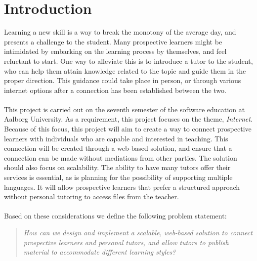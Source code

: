 \chapter{Introduction}
Learning a new skill is a way to break the monotony of the average day, and presents a challenge to the student.
Many prospective learners might be intimidated by embarking on the learning process by themselves, and feel reluctant to start.
One way to alleviate this is to introduce a tutor to the student, who can help them attain knowledge related to the topic and guide them in the proper direction.
This guidance could take place in person, or through various internet options after a connection has been established between the two.
\\\\
This project is carried out on the seventh semester of the software education at Aalborg University. 
As a requirement, this project focuses on the theme, \textit{Internet}.
Because of this focus, this project will aim to create a way to connect prospective learners with individuals who are capable and interested in teaching.
This connection will be created through a web-based solution, and ensure that a connection can be made without mediations from other parties.
The solution should also focus on scalability. 
The ability to have many tutors offer their services is essential, as is planning for the possibility of supporting multiple languages. 
It will allow prospective learners that prefer a structured approach without personal tutoring to access files from the teacher.
\\\\
Based on these considerations we define the following problem statement:
\begin{quote}
    \textit{How can we design and implement a scalable, web-based solution to connect prospective learners and personal tutors, and allow tutors to publish material to accommodate different learning styles?}
\end{quote}
